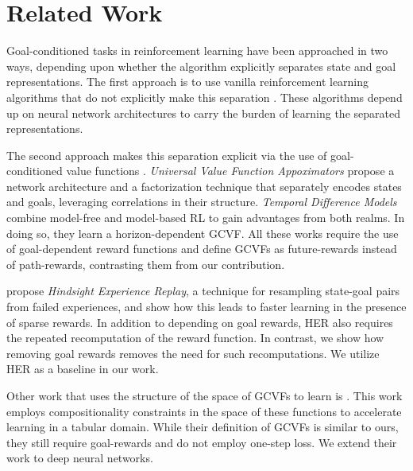 \section{Related Work}

Goal-conditioned tasks in reinforcement learning have been approached in two
ways, depending upon whether the algorithm explicitly separates state and goal
representations.
The first approach is to use vanilla reinforcement
learning algorithms that do not explicitly make this separation
\citep{mirowski2016learning,dosovitskiy2016learning,gupta2017cognitive,parisotto2017neural,mirowski2018learning}.
These algorithms depend up on neural network architectures to
carry the burden of learning the separated representations.

The second approach makes this separation explicit via the use of goal-conditioned value
functions \citep{foster2002structure,sutton2011horde}. \emph{Universal
Value Function Appoximators} \citep{schaul2015universal} propose a
network architecture and a factorization technique that separately
encodes states and goals, leveraging correlations in their structure.
\emph{Temporal Difference Models} combine model-free
and model-based RL to gain advantages from both realms. In doing so, they
learn a horizon-dependent GCVF. All these works require the use of
goal-dependent reward functions and define GCVFs as future-rewards instead of
path-rewards, contrasting them from our contribution. 

\citet{andrychowicz2017hindsight} propose \emph{Hindsight Experience Replay},
a technique for resampling state-goal pairs from failed experiences,
and show how this leads to faster learning in the presence
of sparse rewards. In addition to depending on goal rewards, HER also
requires the repeated recomputation of the reward function. In contrast,
we show how removing goal rewards removes the need for such
recomputations.
We utilize HER as a baseline in our work. 

Other work that uses the structure of the space of GCVFs to learn is
\citet{dhiman2018floydwarshall}. This work employs compositionality constraints
in the space of these functions to accelerate learning in a tabular domain. While
their definition of GCVFs is similar to ours, they still require
goal-rewards and do not employ one-step loss. We extend their
work to deep neural networks.


